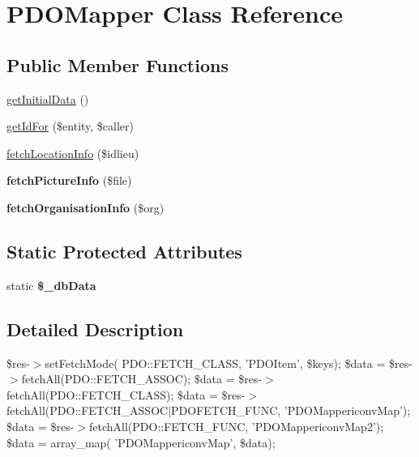 \hypertarget{classPDOMapper}{
\section{PDOMapper Class Reference}
\label{classPDOMapper}
}
\subsection*{Public Member Functions}
\begin{DoxyCompactItemize}
\item 
\hyperlink{classPDOMapper_a37ae240b9b63de4f57243cd1cfc85f17}{getInitialData} ()
\item 
\hyperlink{classPDOMapper_a2ce846fa5d4f722448477cc4a7c46e62}{getIdFor} (\$entity, \$caller)
\item 
\hyperlink{classPDOMapper_af616046b08f17f83370ca1a07b975613}{fetchLocationInfo} (\$idlieu)
\item 
\hypertarget{classPDOMapper_a0729a7cdbcafdf0ace70a3b0aac72f43}{
{\bfseries fetchPictureInfo} (\$file)}
\label{classPDOMapper_a0729a7cdbcafdf0ace70a3b0aac72f43}

\item 
\hypertarget{classPDOMapper_afdcb10ef3d9c643ee18c074b445c4459}{
{\bfseries fetchOrganisationInfo} (\$org)}
\label{classPDOMapper_afdcb10ef3d9c643ee18c074b445c4459}

\end{DoxyCompactItemize}
\subsection*{Static Protected Attributes}
\begin{DoxyCompactItemize}
\item 
\hypertarget{classPDOMapper_afb640cc7ef3dd9db1302266a0433b4af}{
static {\bfseries \$\_\-dbData}}
\label{classPDOMapper_afb640cc7ef3dd9db1302266a0433b4af}

\end{DoxyCompactItemize}


\subsection{Detailed Description}
\$res-\/$>$setFetchMode( PDO::FETCH\_\-CLASS, 'PDOItem', \$keys); \$data = \$res-\/$>$fetchAll(PDO::FETCH\_\-ASSOC); \$data = \$res-\/$>$fetchAll(PDO::FETCH\_\-CLASS); \$data = \$res-\/$>$fetchAll(PDO::FETCH\_\-ASSOC$|$PDOFETCH\_\-FUNC, 'PDOMappericonvMap'); \$data = \$res-\/$>$fetchAll(PDO::FETCH\_\-FUNC, 'PDOMappericonvMap2'); \$data = array\_\-map( 'PDOMappericonvMap', \$data); 

